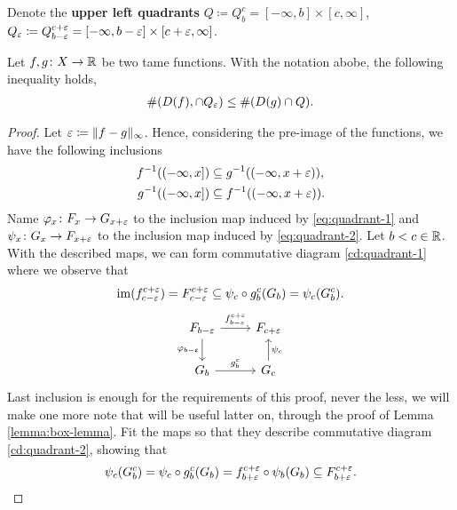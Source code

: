 Denote the {\bf upper left quadrants} $ Q \coloneq Q_b^c = [-\infty, b] \times [c, \infty] $, $ Q_\varepsilon \coloneq Q_{b-\varepsilon}^{c+\varepsilon} = [-\infty, b-\varepsilon] \times [c+\varepsilon, \infty] $.

\begin{lemma} \label{lemma:quadrant-lemma}
    Let $f,g \colon X \to \mathbb R $ be two tame functions. With the notation abobe, the following inequality holds,
    \begin{align}
        \#(D(f), \cap Q_\varepsilon) \leq \#(D(g) \cap Q).
    \end{align}
\end{lemma}
\begin{proof}
    Let $ \varepsilon \coloneq \|f - g\|_\infty $. Hence, considering the pre-image of the functions, we have the following inclusions
    \begin{align}
        f^{-1}((-\infty, x]) &\subseteq g^{-1}((-\infty, x+\varepsilon)), \label{eq:quadrant-1}\\
        g^{-1}((-\infty, x]) &\subseteq f^{-1}((-\infty, x+\varepsilon)). \label{eq:quadrant-2}
    \end{align}
    Name $ \varphi_x \colon F_x \to G_{x+\varepsilon} $  to the inclusion map induced by \eqref{eq:quadrant-1} and $ \psi_x \colon G_x \to F_{x+\varepsilon} $ to the inclusion map induced by \eqref{eq:quadrant-2}. Let $ b<c \in \mathbb R $. With the described maps, we can form commutative diagram \eqref{cd:quadrant-1} where we observe that
    \begin{align} 
        \operatorname{im}(f_{c-\varepsilon}^{c+\varepsilon}) = F_{c-\varepsilon}^{c+\varepsilon} \subseteq \psi_c \circ g_b^c(G_b) = \psi_c (G_b^c).
    \end{align}
    \begin{equation} \label{cd:quadrant-1}
    \begin{tikzcd}
        F_{b-\e} \arrow[r, "f_{b-\e}^{c+\e}"] \arrow[d, "\varphi_{b-\e}"']
        & F_{c+\e} \\
        G_b \arrow[r, "g_b^c"]
        & G_c \arrow[u, "\psi_c"']        
    \end{tikzcd}
    \end{equation}
    Last inclusion is enough for the requirements of this proof, never the less, we will make one more note that will be useful latter on, through the proof of Lemma \ref{lemma:box-lemma}. Fit the maps so that they describe commutative diagram \eqref{cd:quadrant-2}, showing that
    \begin{align}
        \psi_c(G_b^c) = \psi_c \circ g_b^c(G_b) = f_{b+\e}^{c+\e} \circ \psi_b(G_b) \subseteq F_{b+\e}^{c+\e}.

\end{align}
\end{proof}
